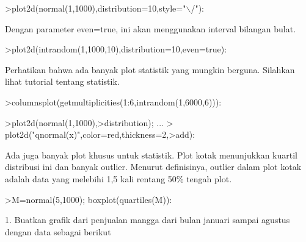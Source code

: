 \documentclass{article}
\begin{document}
\begin{eulernotebook}
\begin{eulercomment}
\begin{eulercomment}
\begin{eulercomment}
\begin{eulercomment}
\begin{eulercomment}
\begin{eulercomment}
\begin{eulercomment}
\begin{eulercomment}
\begin{eulerprompt}
>plot2d(normal(1,1000),distribution=10,style="\(\backslash\)/"):
\end{eulerprompt}
\begin{eulercomment}
Dengan parameter even=true, ini akan menggunakan interval bilangan
bulat.
\end{eulercomment}
\begin{eulerprompt}
>plot2d(intrandom(1,1000,10),distribution=10,even=true):
\end{eulerprompt}
\begin{eulercomment}
Perhatikan bahwa ada banyak plot statistik yang mungkin berguna.
Silahkan lihat tutorial tentang statistik.
\end{eulercomment}
\begin{eulerprompt}
>columnsplot(getmultiplicities(1:6,intrandom(1,6000,6))):
\end{eulerprompt}
\begin{eulerprompt}
>plot2d(normal(1,1000),>distribution); ...
>  plot2d("qnormal(x)",color=red,thickness=2,>add):
\end{eulerprompt}
\begin{eulercomment}
Ada juga banyak plot khusus untuk statistik. Plot kotak menunjukkan
kuartil distribusi ini dan banyak outlier. Menurut definisinya,
outlier dalam plot kotak adalah data yang melebihi 1,5 kali rentang
50\% tengah plot.
\end{eulercomment}
\begin{eulerprompt}
>M=normal(5,1000); boxplot(quartiles(M)):
\end{eulerprompt}
\begin{eulercomment}
1. Buatkan grafik dari penjualan mangga dari bulan januari sampai
agustus dengan data sebagai berikut


\end{eulercomment}
\end{eulercomment}
\end{eulercomment}
\end{eulercomment}
\end{eulercomment}
\end{eulercomment}
\end{eulercomment}
\end{eulercomment}
\end{eulercomment}
\end{eulernotebook}
\end{document}
